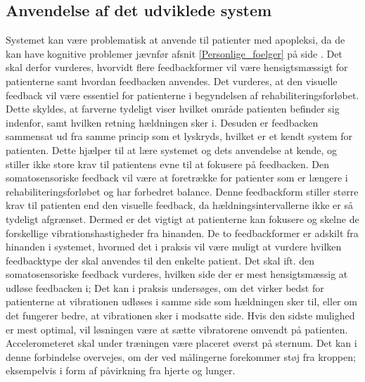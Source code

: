 \subsection{Anvendelse af det udviklede system}
Systemet kan være problematisk at anvende til patienter med apopleksi, da de kan have kognitive problemer jævnfør afsnit \ref{Personlige_foelger} på side \pageref{Personlige_foelger}. Det skal derfor vurderes, hvorvidt flere feedbackformer vil være hensigtsmæssigt for patienterne samt hvordan feedbacken anvendes. Det vurderes, at den visuelle feedback vil være essentiel for patienterne i begyndelsen af rehabiliteringsforløbet. Dette skyldes, at farverne tydeligt viser hvilket område patienten befinder sig indenfor, samt hvilken retning hældningen sker i. Desuden er feedbacken sammensat ud fra samme princip som et lyskryds, hvilket er et kendt system for patienten. Dette hjælper til at lære systemet og dets anvendelse at kende, og stiller ikke store krav til patientens evne til at fokusere på feedbacken. Den somatosensoriske feedback vil være at foretrække for patienter som er længere i rehabiliteringsforløbet og har forbedret balance. Denne feedbackform stiller større krav til patienten end den visuelle feedback, da hældningsintervallerne ikke er så tydeligt afgrænset. Dermed er det vigtigt at patienterne kan fokusere og skelne de forskellige vibrationshastigheder fra hinanden. De to feedbackformer er adskilt fra hinanden i systemet, hvormed det i praksis vil være muligt at vurdere hvilken feedbacktype der skal anvendes til den enkelte patient. 
Det skal ift. den somatosensoriske feedback vurderes, hvilken side der er mest hensigtsmæssig at udløse feedbacken i; Det kan i praksis undersøges, om det virker bedst for patienterne at vibrationen udløses i samme side som hældningen sker til, eller om det fungerer bedre, at vibrationen sker i modsatte side. Hvis den sidste mulighed er mest optimal, vil løsningen være at sætte vibratorene omvendt på patienten. 
Accelerometeret skal under træningen være placeret øverst på sternum. Det kan i denne forbindelse overvejes, om der ved målingerne forekommer støj fra kroppen; eksempelvis i form af påvirkning fra hjerte og lunger.

